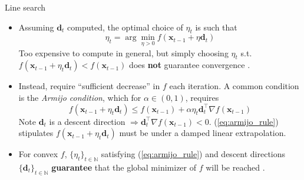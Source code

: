 \documentclass{beamer}
\numberwithin{equation}{section}
\newcommand{\aref}[1]{\alert{\ref{#1}}}
\begin{document}
\begin{frame}{Line search}
    \begin{itemize}
        \item
        Assuming $ \mathbf{d}_t $ computed, the optimal choice of $ \eta_t $
        is such that
        \begin{equation} \label{eq:exact_line_search}
            \eta_t = \arg\min_{\eta > 0}
            f(\mathbf{x}_{t - 1} + \eta\mathbf{d}_t)
        \end{equation}
        Too expensive to compute in general, but simply choosing $ \eta_t $
        s.t. $ f(\mathbf{x}_{t - 1} + \eta_t\mathbf{d}_t) <
        f(\mathbf{x}_{t - 1}) $ does \textbf{not} guarantee convergence
        \cite{nocedal_opt}.

        \item
        Instead, require ``sufficient decrease'' in $ f $ each iteration.
        A common condition is the \textit{Armijo condition}, which for
        $ \alpha \in (0, 1) $, requires
        \begin{equation} \label{eq:armijo_rule}
            f(\mathbf{x}_{t - 1} + \eta_t\mathbf{d}_t) \le
            f(\mathbf{x}_{t - 1}) + \alpha\eta_t\mathbf{d}_t^\top
            \nabla f(\mathbf{x}_{t - 1})
        \end{equation}
        Note $ \mathbf{d}_t $ is a descent direction $ \Rightarrow
        \mathbf{d}_t^\top\nabla f(\mathbf{x}_{t - 1}) < 0 $.
        (\aref{eq:armijo_rule}) stipulates $ f(\mathbf{x}_{t - 1} +
        \eta_t\mathbf{d}_t) $ must be under a damped linear extrapolation.

        \item
        For convex $ f $, $ \{\eta_t\}_{t \in \mathbb{N}} $ satisfying
        (\aref{eq:armijo_rule}) and descent directions
        $ \{\mathbf{d}_t\}_{t \in \mathbb{N}} $ \textbf{guarantee} that the
        global minimizer of $ f $ will be reached \cite{stat_learn_sparsity}.
    \end{itemize}
\end{frame}

\end{document}
